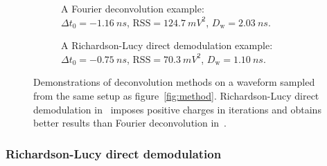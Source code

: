 \begin{figure}[H]
  \begin{subfigure}{0.5\textwidth}
    \centering
    \resizebox{\textwidth}{!}{}
    \caption{\label{fig:fd} A Fourier deconvolution example: \\ $\Delta t_0=\SI{-1.16}{ns}$, $\mathrm{RSS}=\SI{124.7}{mV^2}$, $D_\mathrm{w}=\SI{2.03}{ns}$.}
  \end{subfigure}
  \begin{subfigure}{0.5\textwidth}
    \centering
    \resizebox{\textwidth}{!}{}
    \caption{\label{fig:lucy} A Richardson-Lucy direct demodulation example:\\ $\Delta t_0=\SI{-0.75}{ns}$, $\mathrm{RSS}=\SI{70.3}{mV^2}$, $D_\mathrm{w}=\SI{1.10}{ns}$.}
  \end{subfigure}
  \caption{\label{fig:deconv}Demonstrations of deconvolution methods on a waveform sampled from the same setup as figure~\ref{fig:method}. Richardson-Lucy direct demodulation in~ imposes positive charges in iterations and obtains better results than Fourier deconvolution in~.}
\end{figure}

\subsubsection{Richardson-Lucy direct demodulation}
\label{sec:lucyddm}

